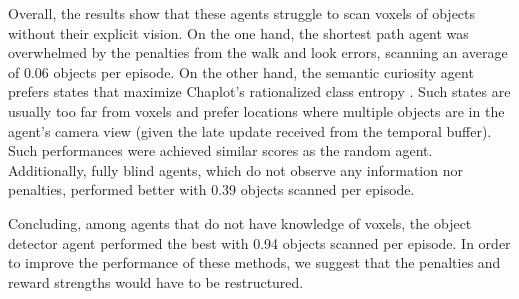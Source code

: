         

        Overall, the results show that these agents struggle to scan voxels of objects without their explicit vision. 
        On the one hand, the shortest path agent was overwhelmed by the penalties from the walk and look errors, scanning an average of 0.06 objects per episode. 
        On the other hand, the semantic curiosity agent prefers states that maximize Chaplot's rationalized class entropy \cite{chaplot2020semantic}. 
        Such states are usually too far from voxels and prefer locations where multiple objects are in the agent's camera view (given the late update received from the temporal buffer). 
        Such performances were achieved similar scores as the random agent. Additionally, fully blind agents, which do not observe any information nor penalties, performed better with 0.39 objects scanned per episode. 
       
        
        Concluding, among agents that do not have knowledge of voxels, the object detector agent performed the best with 0.94 objects scanned per episode. In order to improve the performance of these methods, we suggest that the penalties and reward strengths would have to be restructured.
                
            
